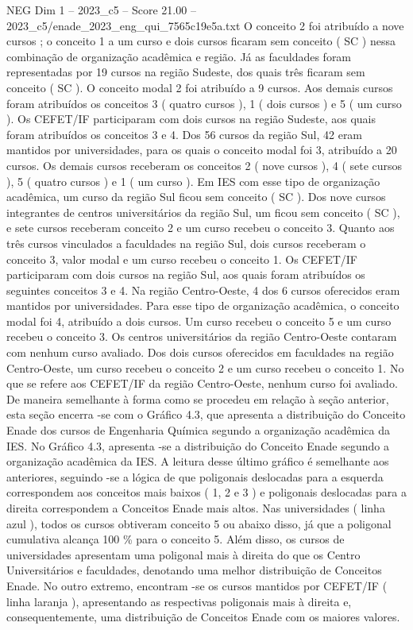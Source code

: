 \begin{textsample}{NEG Dim 1 – 2023\_c5 – Score 21.00 – 2023\_c5/enade\_2023\_eng\_qui\_7565c19e5a.txt}
O conceito 2 foi atribuído a nove cursos ; o conceito 1 a um curso e dois cursos ficaram sem conceito ( SC ) nessa combinação de organização acadêmica e região.
Já as faculdades foram representadas por 19 cursos na região Sudeste, dos quais três ficaram sem conceito ( SC ).
O conceito modal 2 foi atribuído a 9 cursos.
Aos demais cursos foram atribuídos os conceitos 3 ( quatro cursos ), 1 ( dois cursos ) e 5 ( um curso ).
Os CEFET/IF participaram com dois cursos na região Sudeste, aos quais foram atribuídos os conceitos 3 e 4.
Dos 56 cursos da região Sul, 42 eram mantidos por universidades, para os quais o conceito modal foi 3, atribuído a 20 cursos.
Os demais cursos receberam os conceitos 2 ( nove cursos ), 4 ( sete cursos ), 5 ( quatro cursos ) e 1 ( um curso ).
Em IES com esse tipo de organização acadêmica, um curso da região Sul ficou sem conceito ( SC ).
Dos nove cursos integrantes de centros universitários da região Sul, um ficou sem conceito ( SC ), e sete cursos receberam conceito 2 e um curso recebeu o conceito 3.
Quanto aos três cursos vinculados a faculdades na região Sul, dois cursos receberam o conceito 3, valor modal e um curso recebeu o conceito 1.
Os CEFET/IF participaram com dois cursos na região Sul, aos quais foram atribuídos os seguintes conceitos 3 e 4.
Na região Centro-Oeste, 4 dos 6 cursos oferecidos eram mantidos por universidades.
Para esse tipo de organização acadêmica, o conceito modal foi 4, atribuído a dois cursos.
Um curso recebeu o conceito 5 e um curso recebeu o conceito 3.
Os centros universitários da região Centro-Oeste contaram com nenhum curso avaliado.
Dos dois cursos oferecidos em faculdades na região Centro-Oeste, um curso recebeu o conceito 2 e um curso recebeu o conceito 1.
No que se refere aos CEFET/IF da região Centro-Oeste, nenhum curso foi avaliado.
De maneira semelhante à forma como se procedeu em relação à seção anterior, esta seção encerra -se com o Gráfico 4.3, que apresenta a distribuição do Conceito Enade dos cursos de Engenharia Química segundo a organização acadêmica da IES.
No Gráfico 4.3, apresenta -se a distribuição do Conceito Enade segundo a organização acadêmica da IES.
A leitura desse último gráfico é semelhante aos anteriores, seguindo -se a lógica de que poligonais deslocadas para a esquerda correspondem aos conceitos mais baixos ( 1, 2 e 3 ) e poligonais deslocadas para a direita correspondem a Conceitos Enade mais altos.
Nas universidades ( linha azul ), todos os cursos obtiveram conceito 5 ou abaixo disso, já que a poligonal cumulativa alcança 100 \% para o conceito 5.
Além disso, os cursos de universidades apresentam uma poligonal mais à direita do que os Centro Universitários e faculdades, denotando uma melhor distribuição de Conceitos Enade.
No outro extremo, encontram -se os cursos mantidos por CEFET/IF ( linha laranja ), apresentando as respectivas poligonais mais à direita e, consequentemente, uma distribuição de Conceitos Enade com os maiores valores.

\end{textsample}
